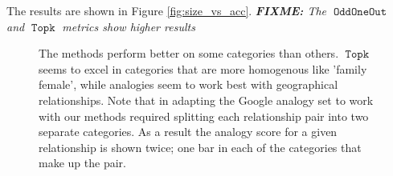 \documentclass[11pt,a4paper]{article}
\DeclareMathOperator{\OddOneOut}{\texttt{OddOneOut}}
\DeclareMathOperator{\topk}{\texttt{Topk}}
\newcommand{\fixme}[1]{{\color{red}\itshape \textbf{FIXME:} {#1}}}
\begin{document}
The results are shown in Figure \ref{fig:size_vs_acc}.
\fixme{
The $\OddOneOut$ and $\topk$ metrics show higher results
}

\begin{figure}
\centering

\caption{
    The methods perform better on some categories than others. $\topk$  seems to excel in categories that are more homogenous like 'family female',
 while analogies seem to work best with geographical relationships.
  Note that in adapting the Google analogy set to work with our methods required splitting each relationship pair into two separate categories. 
  As a result the analogy score for a given relationship is shown twice;
   one bar in each of the categories that make up the pair.
   }
\label{fig:cross_cat_acc}
\end{figure}
\end{document}
